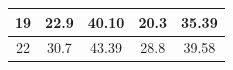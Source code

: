 \documentclass{article}
\begin{document}
\begin{Large}
\begin{table}[h]
\begin{tabular}{|c|cc|cc|}
19                                                                       & \multicolumn{1}{c|}{22.9}                                                    & 40.10                                                       & \multicolumn{1}{c|}{20.3}                                                    & 35.39                                                       \\ \hline
22                                                                       & \multicolumn{1}{c|}{30.7}                                                    & 43.39                                                       & \multicolumn{1}{c|}{28.8}                                                    & 39.58                                                       \\ \hline
\end{tabular}
\end{table}
\newpage

\end{Large}
\end{document}
